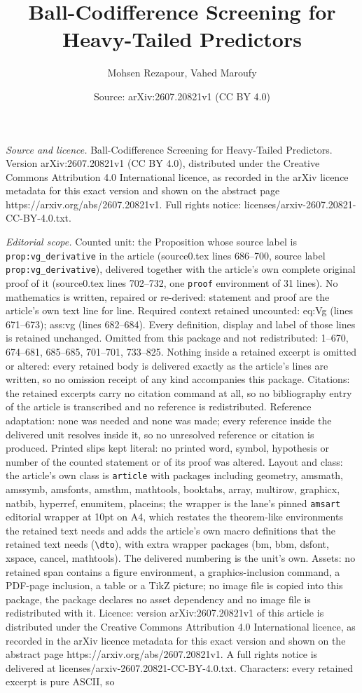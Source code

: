 \documentclass[10pt,a4paper]{amsart}
\title[Ball-Codifference Screening for Heavy-Tailed Predictors]{Ball-Codifference Screening for Heavy-Tailed Predictors}
\author{Mohsen Rezapour, Vahed Maroufy}
\date{Source: arXiv:2607.20821v1 (CC BY 4.0)}
\begin{document}
\maketitle

\noindent\emph{Source and licence.} Ball-Codifference Screening for Heavy-Tailed Predictors. Version arXiv:2607.20821v1 (CC BY 4.0), distributed under the Creative Commons Attribution 4.0 International licence, as recorded in the arXiv licence metadata for this exact version and shown on the abstract page https://arxiv.org/abs/2607.20821v1. Full rights notice: licenses/arxiv-2607.20821-CC-BY-4.0.txt.\par\smallskip

\noindent\textit{Editorial scope.} Counted unit: the Proposition whose source label is \texttt{prop:vg\_derivative} in the article (source0.tex lines 686--700, source label \texttt{prop:vg\_derivative}), delivered together with the article's own complete original proof of it (source0.tex lines 702--732, one \texttt{proof} environment of 31 lines). No mathematics is written, repaired or re-derived: statement and proof are the article's own text line for line. Required context retained uncounted: eq:Vg (lines 671--673); ass:vg (lines 682--684). Every definition, display and label of those lines is retained unchanged. Omitted from this package and not redistributed: 1--670, 674--681, 685--685, 701--701, 733--825. Nothing inside a retained excerpt is omitted or altered: every retained body is delivered exactly as the article's lines are written, so no omission receipt of any kind accompanies this package. Citations: the retained excerpts carry no citation command at all, so no bibliography entry of the article is transcribed and no reference is redistributed. Reference adaptation: none was needed and none was made; every reference inside the delivered unit resolves inside it, so no unresolved reference or citation is produced. Printed slips kept literal: no printed word, symbol, hypothesis or number of the counted statement or of its proof was altered. Layout and class: the article's own class is \texttt{article} with packages including geometry, amsmath, amssymb, amsfonts, amsthm, mathtools, booktabs, array, multirow, graphicx, natbib, hyperref, enumitem, placeins; the wrapper is the lane's pinned \texttt{amsart} editorial wrapper at 10pt on A4, which restates the theorem-like environments the retained text needs and adds the article's own macro definitions that the retained text needs (\texttt{\textbackslash dto}), with extra wrapper packages (bm, bbm, dsfont, xspace, cancel, mathtools). The delivered numbering is the unit's own. Assets: no retained span contains a figure environment, a graphics-inclusion command, a PDF-page inclusion, a table or a TikZ picture; no image file is copied into this package, the package declares no asset dependency and no image file is redistributed with it. Licence: version arXiv:2607.20821v1 of this article is distributed under the Creative Commons Attribution 4.0 International licence, as recorded in the arXiv licence metadata for this exact version and shown on the abstract page https://arxiv.org/abs/2607.20821v1. A full rights notice is delivered at licenses/arxiv-2607.20821-CC-BY-4.0.txt. Characters: every retained excerpt is pure ASCII, so 
\end{document}

